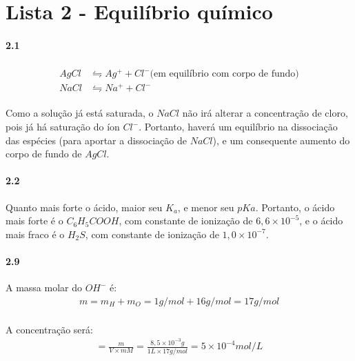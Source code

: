 

\section*{Lista 2 - Equilíbrio químico}

\paragraph*{2.1}

\begin{gather}
    \begin{align}
        AgCl & \leftrightharpoons Ag^+ + Cl^- \text{(em equilíbrio com corpo de fundo)} \\
        NaCl & \leftrightharpoons Na^+ + Cl^-
    \end{align}
\end{gather}

Como a solução já está saturada, o $NaCl$ não irá alterar a concentração de cloro, pois já há saturação do íon $Cl^-$. Portanto, haverá um equilíbrio na dissociação das espécies (para aportar a dissociação de $NaCl$), e um consequente aumento do corpo de fundo de $AgCl$.

\paragraph*{2.2}

Quanto mais forte o ácido, maior seu $K_a$, e menor seu $pKa$. Portanto, o ácido mais forte é o $C_6H_5COOH$, com constante de ionização de $6,6 \times 10^{-5}$, e o ácido mais fraco é o $H_2S$, com constante de ionização de $1,0 \times 10^{-7}$.

\paragraph*{2.9}

A massa molar do $OH^-$ é:
\begin{gather}
    m = m_H + m_O = 1g/mol + 16g/mol = 17g/mol \\
\end{gather}

A concentração será:
\begin{gather}
    [OH^-] = \frac{m}{V \times mM} = \frac{8,5 \times 10^{-3} g}{1L \times 17g/mol} = 5 \times 10^{-4} mol/L
\end{gather}

